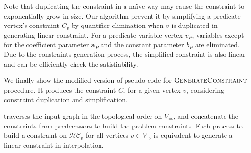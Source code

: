 \documentclass[master,final,12pt]{iscs-thesis}
\begin{document}
Note that duplicating the constraint in a na\"{i}ve way may cause the
constraint to exponentially grow in size.  Our algorithm prevent it by
simplifying a predicate vertex's constraint $C_v$ by quantifier
elimination when $v$ is duplicated in generating linear constraint.
For a predicate variable vertex $v_P$, variables except for the
coefficient parameter $\mathbf{a}_P$ and the constant parameter $b_P$
are eliminated.  Due to the constraints generation process, the
simplified constraint is also linear and can be efficiently check the
satisfiability.

We finally show the modified version of pseudo-code for $\mbox{\sc GenerateConstraint}$
procedure.  It produces the constraint $C_v$ for a given vertex $v$,
considering constraint duplication and simplification.

\begin{algorithm}
\caption{$ \genConstr (G, v, V_\star) $}\label{alg:genConstr}
\begin{algorithmic}
    \ELSE
    \ENDIF
  \ENDFOR
\ENDFOR
\end{algorithmic}
\end{algorithm}


traverses the input graph in the topological order on
$V_\Rightarrow$, and concatenate the constraints from predecessors to
build the problem constraints.  Each process to build a constraint on
$\mathcal{HC}_v$ for all vertices $v \in V_\Rightarrow$ is equivalent
to generate a linear constraint in interpolation.




\end{document}
